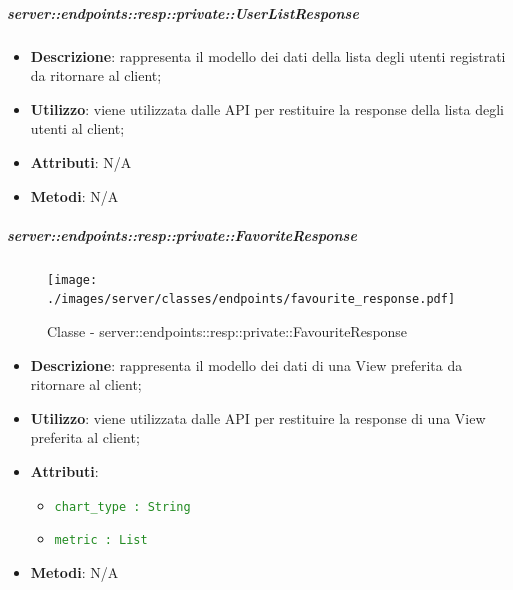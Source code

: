     \subparagraph{server::endpoints::resp::private::UserListResponse} %
    \label{subp:bdsm_app_server_endpoints_resp_private_userlistresponse}
    \begin{itemize}
      \item \textbf{Descrizione}: rappresenta il modello dei dati della lista degli utenti registrati da ritornare al client;
      \item \textbf{Utilizzo}: viene utilizzata dalle API per restituire la response della lista degli utenti al client;
    \item \textbf{Attributi}: N/A
    \item \textbf{Metodi}: N/A
    \end{itemize}

    \subparagraph{server::endpoints::resp::private::FavoriteResponse} %
    \label{subp:bdsm_app_server_endpoints_resp_private_favoriteresponse}
  \begin{figure}[!htbp]
    \centering
    \centerline{\texttt{[image: ./images/server/classes/endpoints/favourite\_response.pdf]}}
    \caption{Classe - server::endpoints::resp::private::FavouriteResponse}
  \end{figure}
    \begin{itemize}
      \item \textbf{Descrizione}: rappresenta il modello dei dati di una View preferita da ritornare al client;
      \item \textbf{Utilizzo}: viene utilizzata dalle API per restituire la response di una View preferita al client;
    \item \textbf{Attributi}:
      \begin{itemize}
        \item \textcolor{forestgreen}{\texttt{chart\_type : String}}
        \item \textcolor{forestgreen}{\texttt{metric : List}}
      \end{itemize}
    \item \textbf{Metodi}: N/A
    \end{itemize}

